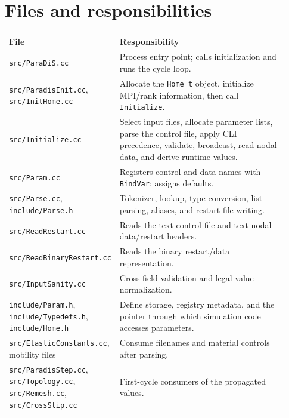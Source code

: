 \documentclass[11pt]{article}
\newcommand{\code}[1]{\texorpdfstring{\nolinkurl{#1}}{#1}}
\newcommand{\srcfile}[1]{\texorpdfstring{\nolinkurl{#1}}{#1}}
\begin{document}
\section{Files and responsibilities}
\begin{longtable}{p{0.29\linewidth}p{0.64\linewidth}}
\toprule
\textbf{File} & \textbf{Responsibility}\\
\midrule
\srcfile{src/ParaDiS.cc} & Process entry point; calls initialization and runs the cycle loop.\\
\srcfile{src/ParadisInit.cc}, \srcfile{src/InitHome.cc} & Allocate the \code{Home_t} object, initialize MPI/rank information, then call \code{Initialize}.\\
\srcfile{src/Initialize.cc} & Select input files, allocate parameter lists, parse the control file, apply CLI precedence, validate, broadcast, read nodal data, and derive runtime values.\\
\srcfile{src/Param.cc} & Registers control and data names with \code{BindVar}; assigns defaults.\\
\srcfile{src/Parse.cc}, \srcfile{include/Parse.h} & Tokenizer, lookup, type conversion, list parsing, aliases, and restart-file writing.\\
\srcfile{src/ReadRestart.cc} & Reads the text control file and text nodal-data/restart headers.\\
\srcfile{src/ReadBinaryRestart.cc} & Reads the binary restart/data representation.\\
\srcfile{src/InputSanity.cc} & Cross-field validation and legal-value normalization.\\
\srcfile{include/Param.h}, \srcfile{include/Typedefs.h}, \srcfile{include/Home.h} & Define storage, registry metadata, and the pointer through which simulation code accesses parameters.\\
\srcfile{src/ElasticConstants.cc}, mobility files & Consume filenames and material controls after parsing.\\
\srcfile{src/ParadisStep.cc}, \srcfile{src/Topology.cc}, \srcfile{src/Remesh.cc}, \srcfile{src/CrossSlip.cc} & First-cycle consumers of the propagated values.\\
\bottomrule
\end{longtable}
\end{document}
